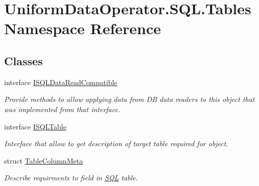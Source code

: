 \hypertarget{namespace_uniform_data_operator_1_1_s_q_l_1_1_tables}{}\section{Uniform\+Data\+Operator.\+S\+Q\+L.\+Tables Namespace Reference}
\label{namespace_uniform_data_operator_1_1_s_q_l_1_1_tables}
\subsection*{Classes}
\begin{DoxyCompactItemize}
\item 
interface \mbox{\hyperlink{interface_uniform_data_operator_1_1_s_q_l_1_1_tables_1_1_i_s_q_l_data_read_compatible}{I\+S\+Q\+L\+Data\+Read\+Compatible}}
\begin{DoxyCompactList}\small\item\em Provide methods to allow applying data from DB data readers to this object that was implemented from that interface. \end{DoxyCompactList}\item 
interface \mbox{\hyperlink{interface_uniform_data_operator_1_1_s_q_l_1_1_tables_1_1_i_s_q_l_table}{I\+S\+Q\+L\+Table}}
\begin{DoxyCompactList}\small\item\em Interface that allow to get description of target table required for object. \end{DoxyCompactList}\item 
struct \mbox{\hyperlink{struct_uniform_data_operator_1_1_s_q_l_1_1_tables_1_1_table_column_meta}{Table\+Column\+Meta}}
\begin{DoxyCompactList}\small\item\em Describe requirments to field in \mbox{\hyperlink{namespace_uniform_data_operator_1_1_s_q_l}{S\+QL}} table. \end{DoxyCompactList}\end{DoxyCompactItemize}
